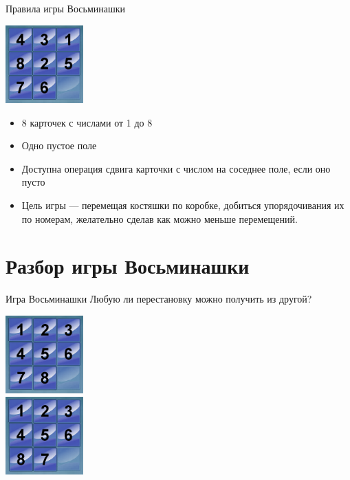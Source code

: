\documentclass[10pt]{beamer}
\begin{document}
\begin{frame}[fragile]{Правила игры Восьминашки}
\begin{center}
    \includegraphics[width=3cm]{Term_2/Source/images/8puzzle.png}
\end{center}
\begin{itemize}
    \item 8 карточек с числами от 1 до 8
    \item Одно пустое поле
    \item Доступна операция сдвига карточки с числом на соседнее поле, если оно пусто
    \item Цель игры — перемещая костяшки по коробке, добиться упорядочивания их по номерам, желательно сделав как можно меньше перемещений.
\end{itemize}
\end{frame}

\section{Разбор игры Восьминашки}

\begin{frame}[fragile]{Игра Восьминашки}
Любую ли перестановку можно получить из другой?
\begin{center}
    \includegraphics[width=3cm]{Term_2/Source/images/8puzzle_correct_even.png} 
    \\
    \includegraphics[width=3cm]{Term_2/Source/images/8puzzle_odd.png}
\end{center}
\end{frame}
\end{document}
